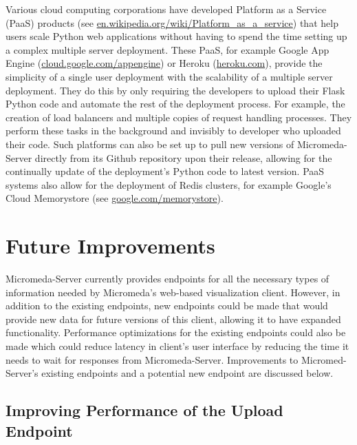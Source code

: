 Various cloud computing corporations have developed Platform as a Service (PaaS) \cite{lawton2008developing} products (see \href{en.wikipedia.org/wiki/Platform\_as\_a\_service}{en.wikipedia.org/wiki/Platform\_as\_a\_service}) that help users scale Python web applications without having to spend the time setting up a complex multiple server deployment. These PaaS, for example Google App Engine (\href{cloud.google.com/appengine}{cloud.google.com/appengine}) or Heroku (\href{heroku.com}{heroku.com}), provide the simplicity of a single user deployment with the scalability of a multiple server deployment. They do this by only requiring the developers to upload their Flask Python code and automate the rest of the deployment process. For example, the creation of load balancers and multiple copies of request handling processes. They perform these tasks in the background and invisibly to developer who uploaded their code. Such platforms can also be set up to pull new versions of Micromeda-Server directly from its Github repository upon their release, allowing for the continually update of the deployment's Python code to latest version. PaaS systems also allow for the deployment of Redis clusters, for example Google's Cloud Memorystore (see \href{cloud.google.com/memorystore/}{google.com/memorystore}).

\section{Future Improvements} \label{micromeda-server-improvements}

Micromeda-Server currently provides endpoints for all the necessary types of information needed by Micromeda's web-based visualization client. However, in addition to the existing endpoints, new endpoints could be made that would provide new data for future versions of this client, allowing it to have expanded functionality. Performance optimizations for the existing endpoints could also be made which could reduce latency in client's user interface by reducing the time it needs to wait for responses from Micromeda-Server. Improvements to Micromed-Server's existing endpoints and a potential new endpoint are discussed below.

\subsection{Improving Performance of the Upload Endpoint}


